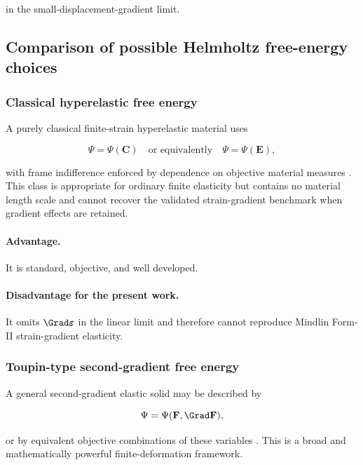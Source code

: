 \documentclass[11pt]{article}
\begin{document}
in the small-displacement-gradient limit.

\subsection{Comparison of possible Helmholtz free-energy choices}

\subsubsection{Classical hyperelastic free energy}

A purely classical finite-strain hyperelastic material uses

\begin{equation}
\Psi=\Psi(\mathbf{C})
\quad
\text{or equivalently}
\quad
\Psi=\Psi(\mathbf{E}),
\label{eq:sec2_classical_hyperelastic}
\end{equation}

with frame indifference enforced by dependence on objective material measures \cite{Rivlin1948,Ogden1997,Holzapfel2000}. This class is appropriate for ordinary finite elasticity but contains no material length scale and cannot recover the validated strain-gradient benchmark when gradient effects are retained.

\paragraph{Advantage.}
It is standard, objective, and well developed.

\paragraph{Disadvantage for the present work.}
It omits $\Grad\bm{\varepsilon}$ in the linear limit and therefore cannot reproduce Mindlin Form-II strain-gradient elasticity.

\subsubsection{Toupin-type second-gradient free energy}

A general second-gradient elastic solid may be described by

\begin{equation}
\Psi=\Psi(\mathbf{F},\Grad\mathbf{F}),
\label{eq:sec2_toupin_type}
\end{equation}

or by equivalent objective combinations of these variables \cite{Toupin1962,Toupin1964,JaviliDellIsolaSteinmann2013,Bertram2015}. This is a broad and mathematically powerful finite-deformation framework.
\end{document}
